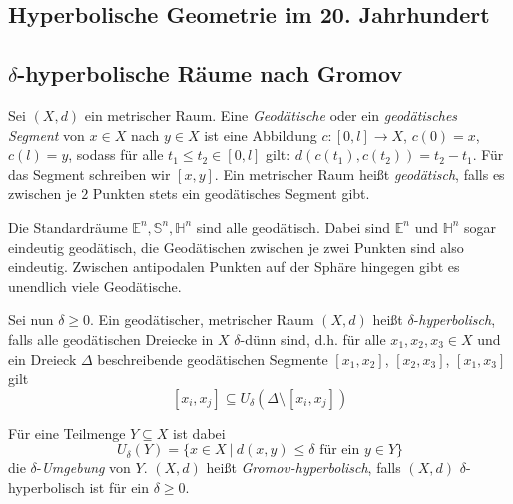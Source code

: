 \documentclass[11pt]{book}
\numberwithin{dummy}{section}
\theoremstyle{nonumberbreak}
\newenvironment{ex}[1][]{\ifthenelse{\equal{#1}{}}{\example}{\example[#1]}\rm}{\endexample}
\newcommand{\E}{\mathbb{E}}
\newcommand{\Sph}{\mathbb{S}}
\newcommand{\He}{\mathbb{H}}
\newcommand{\la}{\longrightarrow}
\begin{document}
\begin{spacing}{1.4}
\chapter{Hyperbolische Geometrie im 20. Jahrhundert} %
\setlength\abovedisplayshortskip{0pt}
\setlength\belowdisplayshortskip{10pt}
\setlength\abovedisplayskip{10pt}
\setlength\belowdisplayskip{10pt}
 



\section{$\delta$-hyperbolische Räume nach Gromov} %

\thispagestyle{empty}



Sei $(X,d)$ ein metrischer Raum. Eine \textit{Geodätische} oder  ein \textit{geodätisches Segment} von $x\in X$ nach $y \in X$ ist eine Abbildung $c: [0,l] \la X$, $c(0)=x$, $c(l)=y$, sodass für alle $t_1\leqslant t_2 \in [0,l]$ gilt: $d(c(t_1), c(t_2)) = t_2-t_1$. Für das Segment schreiben wir $[x,y]$.  Ein metrischer Raum heißt \textit{geodätisch}, falls es zwischen je $2$ Punkten stets ein geodätisches Segment gibt.

\begin{ex}
Die Standardräume $\E^n, \Sph^n, \He^n$ sind alle geodätisch. Dabei sind $\E^n$ und $\He^n$ sogar eindeutig geodätisch, die Geodätischen zwischen je zwei Punkten sind also eindeutig. Zwischen antipodalen Punkten auf der Sphäre hingegen gibt es unendlich viele Geodätische. 
\end{ex}

Sei nun $\delta \geqslant 0$. Ein geodätischer, metrischer Raum $(X,d)$ heißt $\delta$-\textit{hyperbolisch}, falls alle geodätischen Dreiecke in $X$ $\delta$-dünn sind, d.h. für alle $x_1,x_2,x_3 \in X$ und ein Dreieck $\Delta$ beschreibende geodätischen Segmente $[x_1,x_2]$, $[x_2,x_3]$, $[x_1,x_3]$ gilt
$$[x_i,x_j] \subseteq U_{\delta}(\Delta \setminus [x_i,x_j])$$




Für eine Teilmenge $Y \subseteq X$ ist dabei 
$$U_{\delta}(Y) = \{ x \in X \ \vert \ d(x,y) \leqslant \delta \textrm{ für ein }y \in Y\}$$
die $\delta$-\textit{Umgebung} von $Y$. $(X,d)$ heißt \textit{Gromov-hyperbolisch}, falls $(X,d)$ $\delta$-hyperbolisch ist für ein $\delta \geqslant 0$.




\end{spacing}
\end{document}
